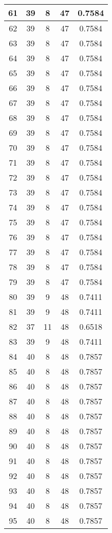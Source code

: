 \documentclass[letterpaper, 12pt]{article}
\begin{document}
\begin{longtable}{|c|c|c|c|c|}
61 & 39 & 8 & 47 & 0.7584 \\
\hline
62 & 39 & 8 & 47 & 0.7584 \\
\hline
63 & 39 & 8 & 47 & 0.7584 \\
\hline
64 & 39 & 8 & 47 & 0.7584 \\
\hline
65 & 39 & 8 & 47 & 0.7584 \\
\hline
66 & 39 & 8 & 47 & 0.7584 \\
\hline
67 & 39 & 8 & 47 & 0.7584 \\
\hline
68 & 39 & 8 & 47 & 0.7584 \\
\hline
69 & 39 & 8 & 47 & 0.7584 \\
\hline
70 & 39 & 8 & 47 & 0.7584 \\
\hline
71 & 39 & 8 & 47 & 0.7584 \\
\hline
72 & 39 & 8 & 47 & 0.7584 \\
\hline
73 & 39 & 8 & 47 & 0.7584 \\
\hline
74 & 39 & 8 & 47 & 0.7584 \\
\hline
75 & 39 & 8 & 47 & 0.7584 \\
\hline
76 & 39 & 8 & 47 & 0.7584 \\
\hline
77 & 39 & 8 & 47 & 0.7584 \\
\hline
78 & 39 & 8 & 47 & 0.7584 \\
\hline
79 & 39 & 8 & 47 & 0.7584 \\
\hline
80 & 39 & 9 & 48 & 0.7411 \\
\hline
81 & 39 & 9 & 48 & 0.7411 \\
\hline
82 & 37 & 11 & 48 & 0.6518 \\
\hline
83 & 39 & 9 & 48 & 0.7411 \\
\hline
84 & 40 & 8 & 48 & 0.7857 \\
\hline
85 & 40 & 8 & 48 & 0.7857 \\
\hline
86 & 40 & 8 & 48 & 0.7857 \\
\hline
87 & 40 & 8 & 48 & 0.7857 \\
\hline
88 & 40 & 8 & 48 & 0.7857 \\
\hline
89 & 40 & 8 & 48 & 0.7857 \\
\hline
90 & 40 & 8 & 48 & 0.7857 \\
\hline
91 & 40 & 8 & 48 & 0.7857 \\
\hline
92 & 40 & 8 & 48 & 0.7857 \\
\hline
93 & 40 & 8 & 48 & 0.7857 \\
\hline
94 & 40 & 8 & 48 & 0.7857 \\
\hline
95 & 40 & 8 & 48 & 0.7857 \\

\end{longtable}
\end{document}
